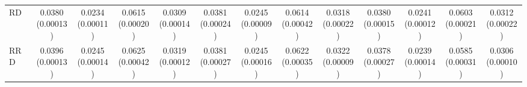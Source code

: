 \begin{table}[t]
\begin{tabular}{lcccccccccccc}
RD & \shortstack[c]{0.0380\\[-1pt]{\tiny(0.00013)}} & \shortstack[c]{0.0234\\[-1pt]{\tiny(0.00011)}} & \shortstack[c]{0.0615\\[-1pt]{\tiny(0.00020)}} & \shortstack[c]{0.0309\\[-1pt]{\tiny(0.00014)}} & \shortstack[c]{0.0381\\[-1pt]{\tiny(0.00024)}} & \shortstack[c]{0.0245\\[-1pt]{\tiny(0.00009)}} & \shortstack[c]{0.0614\\[-1pt]{\tiny(0.00042)}} & \shortstack[c]{0.0318\\[-1pt]{\tiny(0.00022)}} & \shortstack[c]{0.0380\\[-1pt]{\tiny(0.00015)}} & \shortstack[c]{0.0241\\[-1pt]{\tiny(0.00012)}} & \shortstack[c]{0.0603\\[-1pt]{\tiny(0.00021)}} & \shortstack[c]{0.0312\\[-1pt]{\tiny(0.00022)}} \\
RRD & \shortstack[c]{0.0396\\[-1pt]{\tiny(0.00013)}} & \shortstack[c]{0.0245\\[-1pt]{\tiny(0.00014)}} & \shortstack[c]{0.0625\\[-1pt]{\tiny(0.00042)}} & \shortstack[c]{0.0319\\[-1pt]{\tiny(0.00012)}} & \shortstack[c]{0.0381\\[-1pt]{\tiny(0.00027)}} & \shortstack[c]{0.0245\\[-1pt]{\tiny(0.00016)}} & \shortstack[c]{0.0622\\[-1pt]{\tiny(0.00035)}} & \shortstack[c]{0.0322\\[-1pt]{\tiny(0.00009)}} & \shortstack[c]{0.0378\\[-1pt]{\tiny(0.00027)}} & \shortstack[c]{0.0239\\[-1pt]{\tiny(0.00014)}} & \shortstack[c]{0.0585\\[-1pt]{\tiny(0.00031)}} & \shortstack[c]{0.0306\\[-1pt]{\tiny(0.00010)}} \\

\end{tabular}
\end{table}
